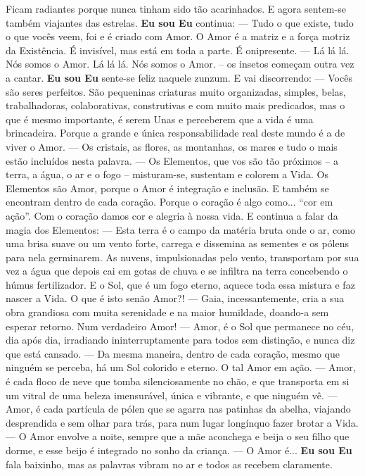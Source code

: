 Ficam radiantes porque nunca tinham sido tão acarinhados. E agora sentem-se também viajantes das estrelas. \textbf{Eu sou Eu} continua:
\bigbreak
— Tudo o que existe, tudo o que vocês veem, foi e é criado com Amor. O Amor é a matriz e a força motriz da Existência. É invisível, mas está em toda a parte. É onipresente.
\bigbreak
— Lá lá lá. Nós somos o Amor. Lá lá lá. Nós somos o Amor. – os insetos começam outra vez a cantar.
\bigbreak
\textbf{Eu sou Eu} sente-se feliz naquele zunzum. E vai discorrendo:
\bigbreak
— Vocês são seres perfeitos. São pequeninas criaturas muito organizadas, simples, belas, trabalhadoras, colaborativas, construtivas e com muito mais predicados, mas o que é mesmo importante, é serem Unas e perceberem que a vida é uma brincadeira. Porque a grande e única responsabilidade real deste mundo é a de viver o Amor.
\bigbreak
— Os cristais, as flores, as montanhas, os mares e tudo o mais estão incluídos nesta palavra.
\bigbreak
— Os Elementos, que vos são tão próximos – a terra, a água, o ar e o fogo – misturam-se, sustentam e colorem a Vida. Os Elementos são Amor, porque o Amor é integração e inclusão. E também se encontram dentro de cada coração. Porque o coração é algo como... “cor em ação”. Com o coração damos cor e alegria à nossa vida.
\bigbreak
E continua a falar da magia dos Elementos:
\bigbreak
— Esta terra é o campo da matéria bruta onde o ar, como uma brisa suave ou um vento forte, carrega e dissemina as sementes e os pólens para nela germinarem. As nuvens, impulsionadas pelo vento, transportam por sua vez a água que depois cai em gotas de chuva e se infiltra na terra concebendo o húmus fertilizador. E o Sol, que é um fogo eterno, aquece toda essa mistura e faz nascer a Vida. O que é isto senão Amor?!
\bigbreak
— Gaia, incessantemente, cria a sua obra grandiosa com muita serenidade e na maior humildade, doando-a sem esperar retorno. Num verdadeiro Amor!
\bigbreak
— Amor, é o Sol que permanece no céu, dia após dia, irradiando ininterruptamente para todos sem distinção, e nunca diz que está cansado.
\bigbreak
— Da mesma maneira, dentro de cada coração, mesmo que ninguém se perceba, há um Sol colorido e eterno. O tal Amor em ação.
\bigbreak
— Amor, é cada floco de neve que tomba silenciosamente no chão, e que transporta em si um vitral de uma beleza imensurável, única e vibrante, e que ninguém vê.
\bigbreak
— Amor, é cada partícula de pólen que se agarra nas patinhas da abelha, viajando desprendida e sem olhar para trás, para num lugar longínquo fazer brotar a Vida.
\bigbreak
— O Amor envolve a noite, sempre que a mãe aconchega e beija o seu filho que dorme, e esse beijo é integrado no sonho da criança.
\bigbreak
— O Amor é...
\bigbreak
\textbf{Eu sou Eu} fala baixinho, mas as palavras vibram no ar e todos as recebem claramente.

